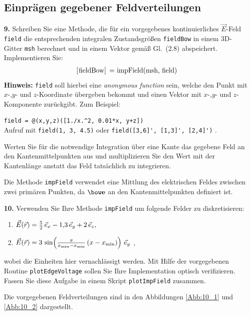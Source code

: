 \documentclass[Protokollheft.tex]{subfiles}
\begin{document}
	



{\subsection{Einprägen gegebener Feldverteilungen}}

        \begin{framed}
	\noindent \textbf{9.} Schreiben Sie eine Methode, die für ein
        vorgegebenes kontinuierliches $\vec{E}$-Feld \lstinline{field}
        die entsprechenden integralen Zustandsgrößen \lstinline{fieldBow}
        in einem 3D-Gitter \lstinline{msh} berechnet und in einem Vektor gemäß
        Gl.~(2.8) abspeichert. Implementieren Sie:
        \begin{align}
            \lstinline{[fieldBow] = impField(msh, field)}
        \end{align}
        {\textbf{Hinweis:}} \lstinline{field} soll hierbei eine \emph{anonymous function} sein, welche den Punkt mit $x$-,$y$- und $z$-Koordinate übergeben bekommt und einen Vektor mit $x$-,$y$- und $z$-Komponente zurückgibt. Zum Beispiel:
        \begin{center}
            \lstinline{field = @(x,y,z)([1./x.^2, 0.01*x, y+z])}\\
            Aufruf mit \lstinline{field(1, 3, 4.5)} oder \lstinline{field([3,6]', [1,3]', [2,4]')} \; .
        \end{center}
        Werten Sie für die notwendige Integration über eine Kante das gegebene Feld an den Kantenmittelpunkten aus und multiplizieren Sie den Wert mit
        der Kantenlänge anstatt das Feld tatsächlich zu integrieren.\label{exer:impField}
\end{framed}
\noindent
Die Methode \lstinline{impField} verwendet eine Mittlung des elektrischen Feldes zwischen zwei primären Punkten, da $\efit$ an den Kantenmittelpunkten definiert ist.

        \begin{framed}
	\noindent \textbf{10.} Verwenden Sie Ihre Methode \lstinline{impField} um folgende Felder zu diskretisieren:
        \begin{enumerate}
            \item $ \vec{E} (\vec r) = \frac{5}{2}\,  \vec{e}_x - 1,\!3\,  \vec{e}_y + 2\,  \vec{e}_z,$
            \item $ \vec{E} (\vec r) = 3\, \sin\! \left(\frac{\pi}{x_\text{max}-x_\text{min}}\, (x-x_\text{min}) \right)\,  \vec{e}_y$ ,
        \end{enumerate}
        wobei die Einheiten hier vernachlässigt werden. Mit Hilfe der vorgegebenen Routine \lstinline{plotEdgeVoltage} sollen Sie Ihre Implementation optisch verifizieren. Fassen Sie diese Aufgabe in einem Skript \lstinline{plotImpField} zusammen.\label{exer:plotImpField}
\end{framed}
	\noindent
	Die vorgegebenen Feldverteilungen sind in den Abbildungen \ref{Abb:10_1} und \ref{Abb:10_2} dargestellt.
\end{document}
